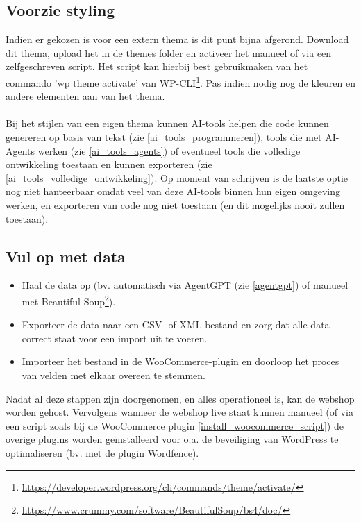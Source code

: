 \subsection{Voorzie styling}
Indien er gekozen is voor een extern thema is dit punt bijna afgerond. Download dit thema, upload het in de themes folder en activeer het manueel of via een zelfgeschreven script. Het script kan hierbij best gebruikmaken van het commando 'wp theme activate' van WP-CLI\footnote{\href{https://developer.wordpress.org/cli/commands/theme/activate/}{https://developer.wordpress.org/cli/commands/theme/activate/}}. Pas indien nodig nog de kleuren en andere elementen aan van het thema.
\\\\
Bij het stijlen van een eigen thema kunnen AI-tools helpen die code kunnen genereren op basis van tekst (zie \ref{ai_tools_programmeren}), tools die met AI-Agents werken (zie \ref{ai_tools_agents}) of eventueel tools die volledige ontwikkeling toestaan en kunnen exporteren (zie \ref{ai_tools_volledige_ontwikkeling}). Op moment van schrijven is de laatste optie nog niet hanteerbaar omdat veel van deze AI-tools binnen hun eigen omgeving werken, en exporteren van code nog niet toestaan (en dit mogelijks nooit zullen toestaan).
\subsection{Vul op met data}
\begin{itemize}
    \item Haal de data op (bv. automatisch via AgentGPT (zie \ref{agentgpt}) of manueel met Beautiful Soup\footnote{\href{https://www.crummy.com/software/BeautifulSoup/bs4/doc/}{https://www.crummy.com/software/BeautifulSoup/bs4/doc/}}).
    \item Exporteer de data naar een CSV- of XML-bestand en zorg dat alle data correct staat voor een import uit te voeren.
    \item Importeer het bestand in de WooCommerce-plugin en doorloop het proces van velden met elkaar overeen te stemmen.
\end{itemize}
Nadat al deze stappen zijn doorgenomen, en alles operationeel is, kan de webshop worden gehost. Vervolgens wanneer de webshop live staat kunnen manueel (of via een script zoals bij de WooCommerce plugin \ref{install_woocommerce_script}) de overige plugins worden geïnstalleerd voor o.a. de beveiliging van WordPress te optimaliseren (bv. met de plugin Wordfence).